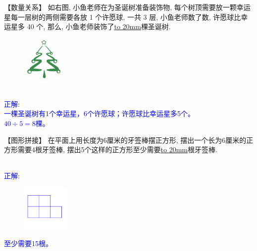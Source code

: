 \item {
    【数量关系】
    如右图, 小鱼老师在为圣诞树准备装饰物, 每个树顶需要放一颗幸运星每一层树的两侧需要各放 1 个许愿球, 一共 3 层, 小鱼老师数了数, 许愿球比幸运星多 40 个, 那么, 小鱼老师装饰了\underline{\hbox to 20mm{}}棵圣诞树.
    \begin{figure}[H] 
        \centering
        \includegraphics[width=0.2\textwidth]{./pics/Chapter_4/13.png}
    \end{figure}
    \ifshowSolution
        \fangsong{}\textcolor{blue}{
            \\正解: \\
            一棵圣诞树有1个幸运星，6个许愿球；许愿球比幸运星多5个。\\
            $40\div 5 = 8$棵。
        }
    \else
        \vspace{1cm}
    \fi
}

\item {
    【图形拼接】
    在平面上用长度为6厘米的牙签棒摆正方形, 摆出一个长为6厘米的正方形需要4根牙签棒, 摆出5个这样的正方形至少需要\underline{\hbox to 20mm{}}根牙签棒. 
    \ifshowSolution 
        \fangsong{}\textcolor{blue}{
            \\正解: \\
            \begin{figure}[H] 
                \centering
                \includegraphics[width=0.2\textwidth]{./pics/Chapter_4/seikai_2016_3d.png}
            \end{figure}
            至少需要15根。
        }
    \else
        \vspace{1cm}
    \fi
}

